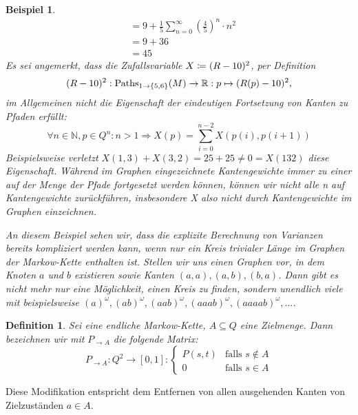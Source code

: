 \documentclass[a4paper]{article}
\newcommand{\mc}{Markow-Kette}
\newtheorem{beispiel}[satz]{Beispiel}
\newtheorem{definition}[satz]{Definition} %
\theoremstyle{nonumberplain}
\begin{document}
\begin{beispiel}
\begin{align*}
		& = 9 + \frac{1}{5}\sum_{n = 0}^{\infty}{\left(\frac{4}{5}\right)^n \cdot n^2} \\
		& = 9 + 36 \\
		& = 45
	\end{align*}
	Es sei angemerkt, dass die Zufallsvariable $X \coloneqq (R-10)^2$, per Definition
	\[
	(R-10)^2 : \mathrm{Paths}_{1 \rightarrow \{5,6\}}(M) \to  \mathbb{R} : p \mapsto (R(p) - 10)^2\text{,}
	\]
	im Allgemeinen nicht die Eigenschaft der eindeutigen Fortsetzung von Kanten zu Pfaden erfüllt:
	\[
	\forall n \in \mathbb{N}, p \in Q^n : n>1 \Rightarrow X(p) = \sum_{i=0}^{n-2}{X(p(i),p(i+1))}
	\]
	Beispielsweise verletzt $X(1,3) + X(3,2) = 25 + 25 \neq 0 = X(132)$ diese Eigenschaft. Während im Graphen eingezeichnete Kantengewichte immer zu einer \rvar{} auf der Menge der Pfade fortgesetzt werden können, können wir nicht alle \rvar{}n auf Kantengewichte zurückführen, insbesondere X also nicht durch Kantengewichte im Graphen einzeichnen.
	
	
	An diesem Beispiel sehen wir, dass die explizite Berechnung von Varianzen bereits kompliziert werden kann, wenn nur ein Kreis trivialer Länge im Graphen der \mc{} enthalten ist. Stellen wir uns einen Graphen vor, in dem Knoten $a$ und $b$ existieren sowie Kanten $(a,a), (a,b), (b,a)$. Dann gibt es nicht mehr nur eine Möglichkeit, einen Kreis zu finden, sondern unendlich viele mit beispielsweise $(a)^\omega, (ab)^\omega, (aab)^\omega, (aaab)^\omega, (aaaab)^\omega,\dots$\;.
\end{beispiel}

\begin{definition}\label{def-pmod}
	Sei \mcex{} eine endliche \mc, $A\subseteq Q$ eine Zielmenge. Dann bezeichnen wir mit $P_{\rightarrow A}$ die folgende Matrix:
	\begin{equation}
	P_{\rightarrow A} : Q^2 \to [0,1] : \begin{cases}
	P(s,t) & \text{falls } s\notin A\\
	0 & \text{falls } s\in A
	\end{cases}
	\end{equation}
\end{definition}

Diese Modifikation entspricht dem Entfernen von allen ausgehenden Kanten von Zielzuständen $a\in A$.
\end{document}
